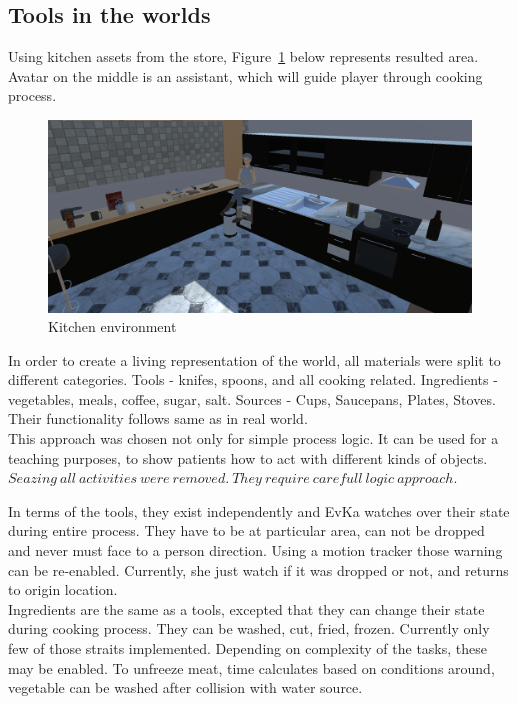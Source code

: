 \documentclass[18pt]{article}
\numberwithin{equation}{section} %
\numberwithin{figure}{section} %
\numberwithin{table}{section} %
\begin{document}
	\subsection{Tools in the worlds}
		Using kitchen assets from the store, Figure~\ref{fig:kitchen} below represents resulted area. Avatar on the middle is an assistant, which will guide player through cooking process. 
		\begin{figure}[H]
			\centering
			\includegraphics[width=0.7\linewidth]{images/kitchen}
			\caption{Kitchen environment}
			\label{fig:kitchen}
		\end{figure}
	
		In order to create a living representation of the world, all materials were split to different categories. Tools - knifes, spoons, and all cooking related. Ingredients - vegetables, meals, coffee, sugar, salt. Sources - Cups, Saucepans, Plates, Stoves. Their functionality follows same as in real world. \\
		This approach was chosen not only for simple process logic. It can be used for a teaching purposes, to show patients how to act with different kinds of objects. \\
		
		$ Seazing\ all\ activities\ were\ removed.\ They\ require\ carefull\ logic\ approach. $
		
		In terms of the tools, they exist independently and EvKa watches over their state during entire process. They have to be at particular area, can not be dropped and never must face to a person direction. Using a motion tracker those warning can be re-enabled. Currently, she just watch if it was dropped or not, and returns to origin location. \\
		
		Ingredients are the same as a tools, excepted that they can change their state during cooking process. They can be washed, cut, fried, frozen. Currently only few of those straits implemented. Depending on complexity of the tasks, these may be enabled. To unfreeze meat, time calculates based on conditions around, vegetable can be washed after collision with water source. \\
		
\end{document}
